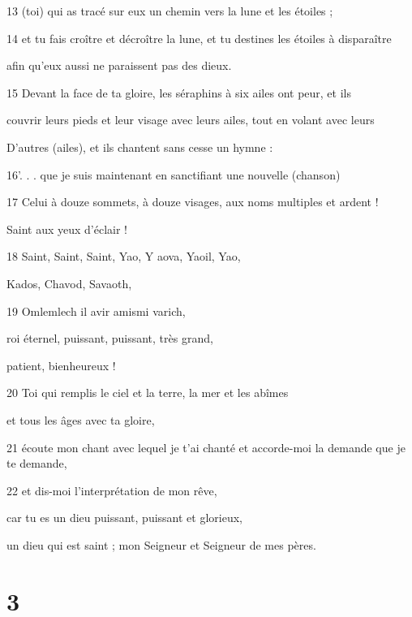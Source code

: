 \par 13 (toi) qui as tracé sur eux un chemin vers la lune et les étoiles ;

\par 14 et tu fais croître et décroître la lune, et tu destines les étoiles à disparaître
\par afin qu'eux aussi ne paraissent pas des dieux.

\par 15 Devant la face de ta gloire, les séraphins à six ailes ont peur, et ils
\par couvrir leurs pieds et leur visage avec leurs ailes, tout en volant avec leurs
\par D'autres (ailes), et ils chantent sans cesse un hymne :

\par 16'. . . que je suis maintenant en sanctifiant une nouvelle (chanson)

\par 17 Celui à douze sommets, à douze visages, aux noms multiples et ardent !
\par Saint aux yeux d'éclair !

\par 18 Saint, Saint, Saint, Yao, Y aova, Yaoil, Yao,
\par Kados, Chavod, Savaoth,

\par 19 Omlemlech il avir amismi varich,
\par roi éternel, puissant, puissant, très grand,
\par patient, bienheureux !

\par 20 Toi qui remplis le ciel et la terre, la mer et les abîmes
\par et tous les âges avec ta gloire,

\par 21 écoute mon chant avec lequel je t'ai chanté et accorde-moi la demande que je te demande,

\par 22 et dis-moi l'interprétation de mon rêve,
\par car tu es un dieu puissant, puissant et glorieux,
\par un dieu qui est saint ; mon Seigneur et Seigneur de mes pères.

\chapter{3}


